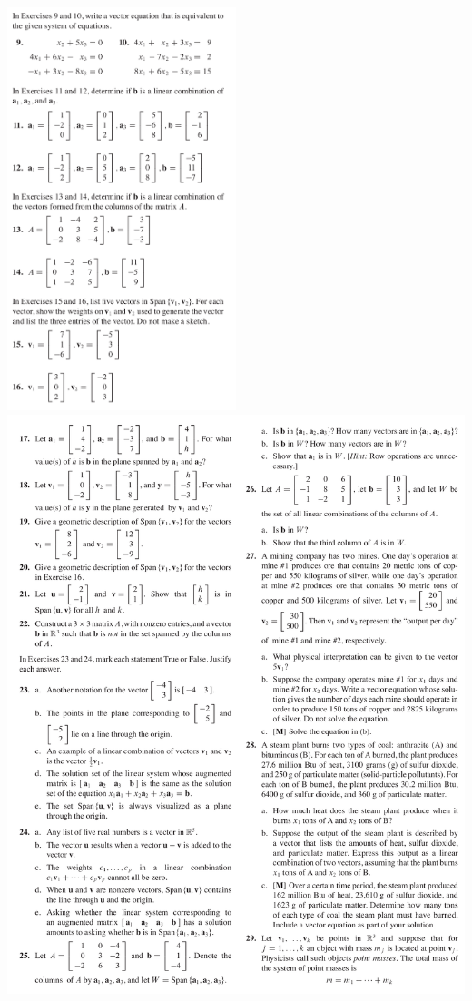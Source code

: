 \documentclass[a4paper,11pt,reqno]{amsart}
\numberwithin{equation}{section}
\begin{document}
\includegraphics[width=0.5\textwidth]{exercises/ve_1.png}
\newpage
\includegraphics[width=\textwidth]{exercises/ve_2.png}
\newpage
\end{document}

